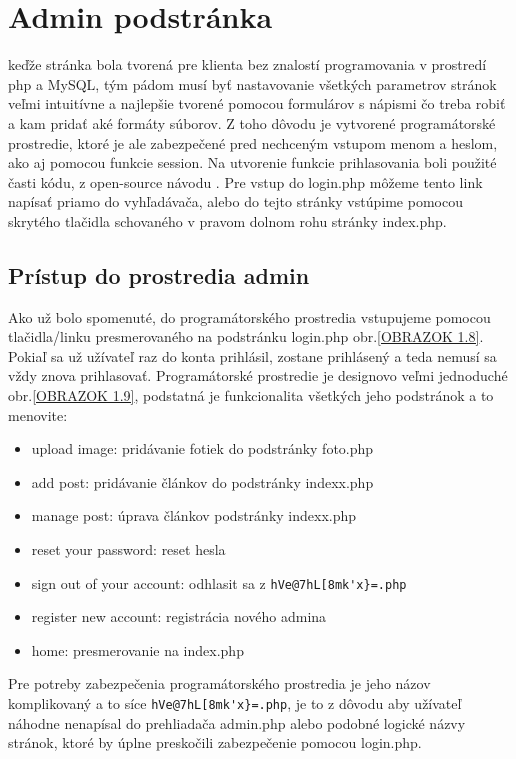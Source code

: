 \chapter{Admin podstránka}

keďže stránka bola tvorená pre klienta bez znalostí programovania v prostredí php a MySQL, tým pádom musí byť nastavovanie všetkých parametrov stránok veľmi intuitívne a najlepšie tvorené pomocou formulárov s nápismi čo treba robiť a kam pridať aké formáty súborov. Z toho dôvodu je vytvorené programátorské prostredie, ktoré je ale zabezpečené pred nechceným vstupom menom a heslom, ako aj pomocou funkcie session. Na utvorenie funkcie prihlasovania boli použité časti kódu, z open-source návodu \cite{login}. Pre vstup do login.php môžeme tento link napísať priamo do vyhľadávača, alebo do tejto stránky vstúpime pomocou skrytého tlačidla schovaného v pravom dolnom rohu stránky index.php.

\section{Prístup do prostredia admin}

Ako už bolo spomenuté, do programátorského prostredia vstupujeme pomocou tlačidla/linku presmerovaného na podstránku login.php obr.\ref{OBRAZOK 1.8}. Pokiaľ sa už užívateľ raz do konta prihlásil, zostane prihlásený a teda nemusí sa vždy znova prihlasovať. Programátorské prostredie je designovo veľmi jednoduché obr.\ref{OBRAZOK 1.9}, podstatná je funkcionalita všetkých jeho podstránok a to menovite:

\begin{itemize}
\item upload image: pridávanie fotiek do podstránky foto.php
\item add post: pridávanie článkov do podstránky indexx.php
\item manage post: úprava článkov podstránky indexx.php
\item reset your password: reset hesla
\item sign out of your account: odhlasit sa z \verb|hVe@7hL[8mk'x}=.php|
\item register new account: registrácia nového admina
\item home: presmerovanie na index.php
\end{itemize}

Pre potreby zabezpečenia programátorského prostredia je jeho názov komplikovaný a to síce \verb|hVe@7hL[8mk'x}=.php|, je to z dôvodu aby užívateľ náhodne nenapísal do prehliadača admin.php alebo podobné logické názvy stránok, ktoré by úplne preskočili zabezpečenie pomocou login.php.

